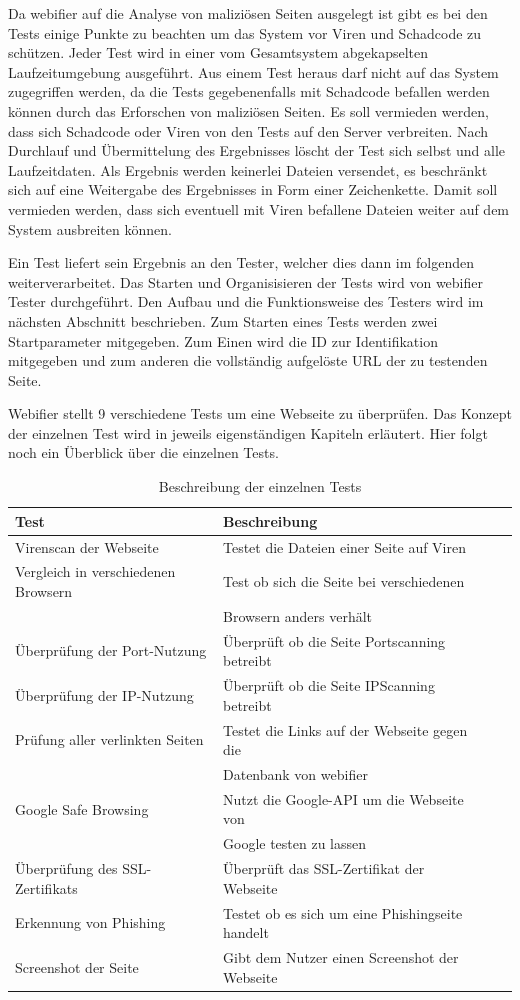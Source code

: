 Da webifier auf die Analyse von maliziösen Seiten ausgelegt ist gibt es bei den Tests einige Punkte zu beachten um das System vor Viren und Schadcode zu schützen.
Jeder Test wird in einer vom Gesamtsystem abgekapselten Laufzeitumgebung ausgeführt. Aus einem Test heraus darf nicht auf das System zugegriffen werden, da die Tests gegebenenfalls mit Schadcode befallen werden können durch das Erforschen von maliziösen Seiten. Es soll vermieden werden, dass sich Schadcode oder Viren von den Tests auf den Server verbreiten. Nach Durchlauf und Übermittelung des Ergebnisses löscht der Test sich selbst und alle Laufzeitdaten. Als Ergebnis werden keinerlei Dateien versendet, es beschränkt sich auf eine Weitergabe des Ergebnisses in Form einer Zeichenkette. Damit soll vermieden werden, dass sich eventuell mit Viren befallene Dateien weiter auf dem System ausbreiten können.

Ein Test liefert sein Ergebnis an den Tester, welcher dies dann im folgenden weiterverarbeitet.
Das Starten und Organisisieren der Tests wird von webifier Tester durchgeführt. Den Aufbau und die Funktionsweise des Testers wird im nächsten Abschnitt beschrieben. Zum Starten eines Tests werden zwei Startparameter mitgegeben. Zum Einen wird die ID zur Identifikation mitgegeben und zum anderen die vollständig aufgelöste URL der zu testenden Seite.
 
Webifier stellt 9 verschiedene Tests um eine Webseite zu überprüfen. Das Konzept der einzelnen Test wird in jeweils eigenständigen Kapiteln erläutert. Hier folgt noch ein Überblick über die einzelnen Tests.

\begin{table}[H]
\centering
\begin{tabular}{|l|l|l|l|}
\hline
\textbf{Test} & \textbf{Beschreibung} \\\hline
Virenscan der Webseite & Testet die Dateien einer Seite auf Viren \\\hline
Vergleich in verschiedenen Browsern & Test ob sich die Seite bei verschiedenen \\ & Browsern anders verhält \\\hline
Überprüfung der Port-Nutzung & Überprüft ob die Seite Portscanning betreibt \\\hline
Überprüfung der IP-Nutzung & Überprüft ob die Seite IPScanning betreibt \\\hline
Prüfung aller verlinkten Seiten & Testet die Links auf der Webseite gegen die \\ & Datenbank von webifier \\\hline
Google Safe Browsing & Nutzt die Google-API um die Webseite von \\ & Google testen zu lassen \\\hline
Überprüfung des SSL-Zertifikats & Überprüft das SSL-Zertifikat der Webseite \\\hline
Erkennung von Phishing & Testet ob es sich um eine Phishingseite handelt \\\hline
Screenshot der Seite & Gibt dem Nutzer einen Screenshot der Webseite \\\hline
\end{tabular}
\caption{Beschreibung der einzelnen Tests}
\label{tbl:tests}
\end{table}

